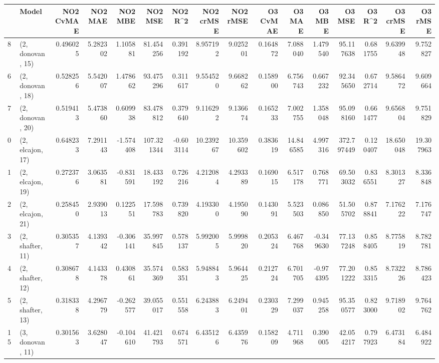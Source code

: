 \begin{tabular}{llrrrrrrrrrrrrrr}
\toprule
{} &             Model &  NO2 CvMAE &   NO2 MAE &   NO2 MBE &     NO2 MSE &   NO2 R\textasciicircum2 &  NO2 crMSE &   NO2 rMSE &  O3 CvMAE &     O3 MAE &    O3 MBE &      O3 MSE &    O3 R\textasciicircum2 &   O3 crMSE &    O3 rMSE \\
\midrule
8  &  (2, donovan, 15) &   0.496025 &  5.282302 &  1.105881 &   81.454256 &  0.391192 &   8.957192 &   9.025201 &  0.164872 &   7.088040 &  1.479540 &   95.117638 &  0.681755 &   9.639948 &   9.752827 \\
6  &  (2, donovan, 18) &   0.528256 &  5.542007 &  1.478662 &   93.475296 &  0.311617 &   9.554520 &   9.668262 &  0.158900 &   6.756743 &  0.667232 &   92.345650 &  0.672714 &   9.586472 &   9.609664 \\
7  &  (2, donovan, 20) &   0.519413 &  5.473860 &  0.609938 &   83.478812 &  0.379640 &   9.116292 &   9.136674 &  0.165233 &   7.002755 &  1.358048 &   95.098160 &  0.661477 &   9.656804 &   9.751829 \\
0  &  (2, elcajon, 17) &   0.648233 &  7.291143 & -1.574408 &  107.321344 & -0.603114 &  10.239267 &  10.359602 &  0.383619 &  14.846585 &  4.997316 &  372.797449 &  0.120407 &  18.650048 &  19.307963 \\
1  &  (2, elcajon, 19) &   0.272376 &  3.063581 & -0.831591 &   18.433192 &  0.726216 &   4.212084 &   4.293389 &  0.169015 &   6.517178 &  0.768771 &   69.503032 &  0.836551 &   8.301327 &   8.336848 \\
2  &  (2, elcajon, 21) &   0.258450 &  2.939013 &  0.122551 &   17.598783 &  0.739820 &   4.193300 &   4.195090 &  0.143091 &   5.523503 &  0.086850 &   51.505702 &  0.878841 &   7.176222 &   7.176747 \\
3  &  (2, shafter, 11) &   0.305357 &  4.139342 & -0.306141 &   35.997845 &  0.578137 &   5.992005 &   5.999820 &  0.205324 &   6.467768 & -0.349630 &   77.137248 &  0.858405 &   8.775819 &   8.782781 \\
4  &  (2, shafter, 12) &   0.308678 &  4.143378 &  0.430861 &   35.574369 &  0.583351 &   5.948843 &   5.964425 &  0.212724 &   6.701705 & -0.974395 &   77.201222 &  0.853315 &   8.732226 &   8.786423 \\
5  &  (2, shafter, 13) &   0.318338 &  4.296779 & -0.262577 &   39.055017 &  0.551558 &   6.243883 &   6.249401 &  0.230329 &   7.299037 &  0.945258 &   95.350577 &  0.823000 &   9.718902 &   9.764762 \\
15 &  (3, donovan, 11) &   0.301563 &  3.628047 & -0.104610 &   41.421793 &  0.674571 &   6.435126 &   6.435976 &  0.158209 &   4.711968 &  0.390005 &   42.054217 &  0.797923 &   6.473184 &   6.484922 \\

\end{tabular}
